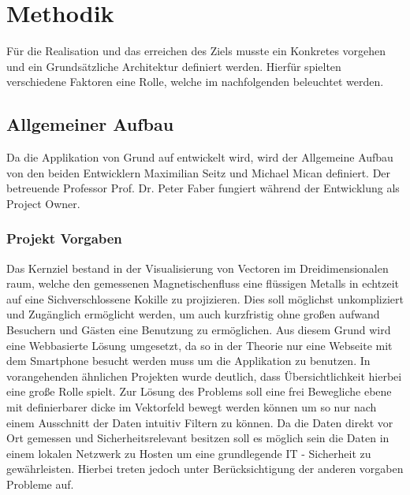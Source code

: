 \section{Methodik}
Für die Realisation und das erreichen des Ziels musste ein Konkretes vorgehen und ein Grundsätzliche Architektur definiert werden. Hierfür spielten verschiedene Faktoren eine Rolle, welche im nachfolgenden beleuchtet werden.

\subsection{Allgemeiner Aufbau}
Da die Applikation von Grund auf entwickelt wird, wird der Allgemeine Aufbau von den beiden Entwicklern Maximilian Seitz und Michael Mican definiert. Der betreuende Professor Prof. Dr. Peter Faber fungiert während der Entwicklung als Project Owner.

\subsubsection{Projekt Vorgaben}
Das Kernziel bestand in der Visualisierung von Vectoren im Dreidimensionalen raum, welche den gemessenen Magnetischenfluss eine flüssigen Metalls in echtzeit auf eine Sichverschlossene Kokille zu projizieren. Dies soll möglichst unkompliziert und Zugänglich ermöglicht werden, um auch kurzfristig ohne großen aufwand Besuchern und Gästen eine Benutzung zu ermöglichen. Aus diesem Grund wird eine Webbasierte Lösung umgesetzt, da so in der Theorie nur eine Webseite mit dem Smartphone besucht werden muss um die Applikation zu benutzen. In vorangehenden ähnlichen Projekten wurde deutlich, dass Übersichtlichkeit hierbei eine große Rolle spielt. Zur Lösung des Problems soll eine frei Bewegliche ebene mit definierbarer dicke im Vektorfeld bewegt werden können um so nur nach einem Ausschnitt der Daten intuitiv Filtern zu können. Da die Daten direkt vor Ort gemessen und Sicherheitsrelevant besitzen soll es möglich sein die Daten in einem lokalen Netzwerk zu Hosten um eine grundlegende IT - Sicherheit zu gewährleisten. Hierbei treten jedoch unter Berücksichtigung der anderen vorgaben Probleme auf.


%	
%	


